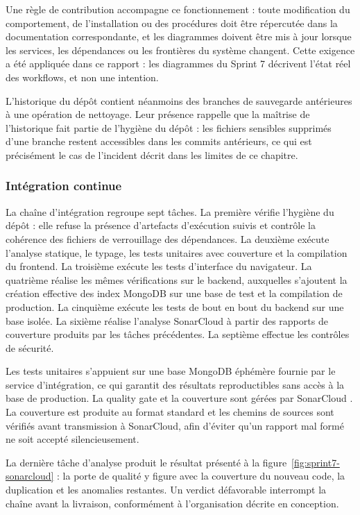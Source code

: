 Une règle de contribution accompagne ce fonctionnement : toute modification du comportement, de l'installation ou des procédures doit être répercutée dans la documentation correspondante, et les diagrammes doivent être mis à jour lorsque les services, les dépendances ou les frontières du système changent. Cette exigence a été appliquée dans ce rapport : les diagrammes du Sprint 7 décrivent l'état réel des workflows, et non une intention.

L'historique du dépôt contient néanmoins des branches de sauvegarde antérieures à une opération de nettoyage. Leur présence rappelle que la maîtrise de l'historique fait partie de l'hygiène du dépôt : les fichiers sensibles supprimés d'une branche restent accessibles dans les commits antérieurs, ce qui est précisément le cas de l'incident décrit dans les limites de ce chapitre.

\subsubsection{Intégration continue}

La chaîne d'intégration regroupe sept tâches. La première vérifie l'hygiène du dépôt : elle refuse la présence d'artefacts d'exécution suivis et contrôle la cohérence des fichiers de verrouillage des dépendances. La deuxième exécute l'analyse statique, le typage, les tests unitaires avec couverture et la compilation du frontend. La troisième exécute les tests d'interface du navigateur. La quatrième réalise les mêmes vérifications sur le backend, auxquelles s'ajoutent la création effective des index MongoDB sur une base de test et la compilation de production. La cinquième exécute les tests de bout en bout du backend sur une base isolée. La sixième réalise l'analyse SonarCloud à partir des rapports de couverture produits par les tâches précédentes. La septième effectue les contrôles de sécurité.

Les tests unitaires s'appuient sur une base MongoDB éphémère fournie par le service d'intégration, ce qui garantit des résultats reproductibles sans accès à la base de production. La quality gate et la couverture sont gérées par SonarCloud \cite{sonarcloud_docs}. La couverture est produite au format standard et les chemins de sources sont vérifiés avant transmission à SonarCloud, afin d'éviter qu'un rapport mal formé ne soit accepté silencieusement.

La dernière tâche d'analyse produit le résultat présenté à la figure~\ref{fig:sprint7-sonarcloud} : la porte de qualité y figure avec la couverture du nouveau code, la duplication et les anomalies restantes. Un verdict défavorable interrompt la chaîne avant la livraison, conformément à l'organisation décrite en conception.

